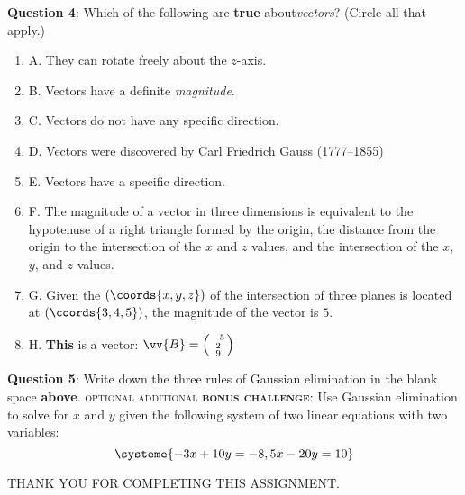 \documentclass[12pt,tiks]{article}
\newcommand{\icol}[1]{%
  \left(\begin{smallmatrix}#1\end{smallmatrix}\right)%
}
\begin{document}
    \begin{minipage}[t][.7in][t]{3in}\RaggedRight
    \-\vspace*{.1in}
    \textbf{Question 4}: Which of the following are \textbf{true} about\textit{vectors}? (Circle all that apply.)
        \begin{enumerate}
            \item A. They can rotate freely about the $z$-axis.
            \item B. Vectors have a definite \textit{magnitude}.
            \item C. Vectors do not have any specific direction.
            \item D. Vectors were discovered by  Carl Friedrich Gauss (1777–1855)
            \item E. Vectors have a specific direction.
            \item F. The magnitude of a vector in three dimensions is equivalent to the hypotenuse of a right triangle formed by the origin, the distance from the origin to the intersection of the $x$ and $z$ values, and the intersection of the $x$, $y$, and $z$ values.
            \item G. Given the $(\coords{x,y,z})$ of the intersection of three planes is located at $(\coords{3,4,5})$, the magnitude of the vector is $5$.
            \item H. \textbf{This} is a vector: $\vv{B}=\icol{-5\\2\\9}$
        \end{enumerate}
    \end{minipage}
    \hspace{.1in}
     \begin{minipage}[t][.7in][t]{3in}\RaggedRight
        \-\vspace*{.1in}
        \textbf{Question 5}: Write down the three rules of Gaussian elimination in the blank space \textbf{above}. \textsc{optional additional \textbf{\textsc{bonus challenge}}}: Use Gaussian elimination to solve for $x$ and $y$ given the following system of two linear equations with two variables:
        \begin{equation*}
              \systeme{
                      -3x+10y=-8,
                      5x-20y=10
                      }
            \end{equation*}
    \end{minipage}
    
    \-\vspace*{\fill}
    
    \Centering\textsc{THANK YOU FOR COMPLETING THIS ASSIGNMENT.}
    
    
\end{document}
